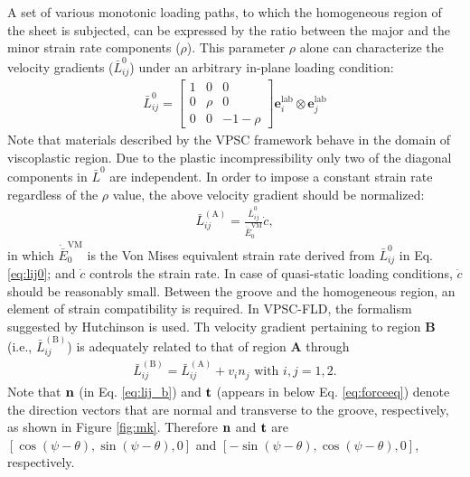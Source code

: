 \documentclass[12pt]{amsart}
\begin{document}
A set of various monotonic loading paths, to which the homogeneous region of the sheet is subjected, can be expressed by the ratio between the major and the minor strain rate components ($\rho$).
This parameter $\rho$ alone can characterize the velocity gradients ($\bar{L}^0_{ij}$) under an arbitrary in-plane loading condition:
\begin{eqnarray}
  \label{eq:lij0}
  \bar{L}^0_{ij} =
  \begin{bmatrix}
    1 & 0 & 0 \\
    0 & \rho & 0 \\
    0 & 0 & -1-\rho
  \end{bmatrix} \mathbf{e}^\mathrm{lab}_i \otimes \mathbf{e}^\mathrm{lab}_j
\end{eqnarray}
Note that materials described by the VPSC framework behave in the domain of viscoplastic region.
Due to the plastic incompressibility only two of the diagonal components in $\bar{L}^0$ are independent.
\newline
In order to impose a constant strain rate regardless of the $\rho$ value, the above velocity gradient should be normalized:
\begin{eqnarray}
  \label{eq:lij}
  \bar{L}^\mathrm{(A)}_{ij} = \frac{\bar{L}^0_{ij}}{\dot{\bar{E}}_0^\mathrm{VM}} \dot{c},
\end{eqnarray}
in which $\dot{\bar{E}}_0^\mathrm{VM}$ is the Von Mises equivalent strain rate derived from $\bar{L}^0_{ij}$ in Eq. \ref{eq:lij0};
and $\dot{c}$ controls the strain rate.
In case of quasi-static loading conditions, $\dot{c}$ should be reasonably small.
\newline
Between the groove and the homogeneous region, an element of strain compatibility is required.
In VPSC-FLD, the formalism suggested by Hutchinson \cite{hutchinson1978sheetII,hutchinson1978sheet} is used.
Th velocity gradient pertaining to region \textbf{B} (i.e., $\bar{L}_{ij}^\mathrm{(B)}$) is adequately related to that of region \textbf{A} through
\begin{eqnarray}
  \label{eq:lij_b}
  \bar{L}^\mathrm{(B)}_{ij} = \bar{L}^\mathrm{(A)}_{ij} + v_i n_j \text{ with } i,j=1,2.
\end{eqnarray}
Note that $\bf{n}$ (in Eq. \ref{eq:lij_b}) and $\bf{t}$ (appears in below Eq. \ref{eq:forceeq}) denote the direction vectors that are normal and transverse to the groove, respectively, as shown in Figure \ref{fig:mk}.
Therefore $\bf{n}$ and $\bf{t}$ are $[\cos(\psi-\theta), \sin(\psi-\theta),0] $ and $[-\sin(\psi-\theta), \cos(\psi-\theta), 0]$, respectively.
\end{document}
